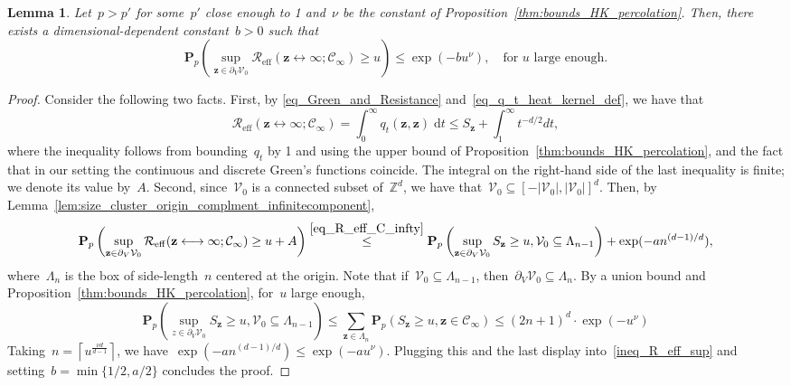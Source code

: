 \documentclass[a4paper,11pt]{article}
\newcommand{\ZZ}{\mathbb{Z}}
\newtheorem{lemma}{Lemma}
\theoremstyle{definition}
\begin{document}
\begin{lemma}\label{lemma:sup_reff_C_infty}
Let~$p>p'$ for some~$p'$ close enough to 1 and~$\nu$ be the constant of Proposition~\ref{thm:bounds_HK_percolation}. Then, there exists a dimensional-dependent constant~$b>0$ such that
$$ \mathbf P_p \left( \sup_{ \mathbf z \in \partial_V\mathcal V_0} \mathcal R_\mathrm{eff}( \mathbf z \longleftrightarrow \infty ; \mathcal C_\infty ) \ge u \right) \leq  \exp( -b u^\nu ), \quad \text{for } u \text{ large enough.} $$
\end{lemma}
\begin{proof}
Consider the following two facts. First, by \eqref{eq_Green_and_Resistance} and~\eqref{eq_q_t_heat_kernel_def}, we have that 
\begin{equation}\label{eq_R_eff_C_infty}
\mathcal R_\mathrm{eff}( \mathbf{z} \longleftrightarrow \infty; \mathcal C_{\infty} ) = \int_0^\infty q_t(\mathbf z,\mathbf z) \; \mathrm{d}t \leq S_\mathbf{z} + \int_1^{\infty} t^{-d/2}dt,
\end{equation}
where the inequality follows from bounding~$q_t$ by 1 and using the upper bound of Proposition~\ref{thm:bounds_HK_percolation}, and the fact that in our setting the continuous and discrete Green's functions coincide. The integral on the right-hand side of the last inequality is finite; we denote its value by~$A$. Second, since~$\mathcal V_0$ is a connected subset of~$\ZZ^d$, we have that~$\mathcal V_0 \subseteq [-|\mathcal V_0|, |\mathcal V_0|]^d$. Then, by Lemma~\ref{lem:size_cluster_origin_complment_infinitecomponent},
\begin{equation}\label{ineq_R_eff_sup}
\mathbf P_p \left( \sup_{\mathbf z \in \partial_V\mathcal V_0} \mathcal R_\mathrm{eff}( \mathbf z \longleftrightarrow \infty ; \mathcal C_\infty ) \ge u + A \right) \stackrel{\eqref{eq_R_eff_C_infty}} \leq \mathbf P_p \left( \sup_{\mathbf z \in \partial_V\mathcal V_0} S_\mathbf{z} \ge u, \mathcal V_0 \subseteq \Lambda_{n-1} \right) + \exp(-an^{(d-1)/d}),
\end{equation}
where~$\Lambda_n$ is the box of side-length~$n$ centered at the origin. Note that if~$\mathcal V_0 \subseteq \Lambda_{n-1}$, then~$\partial_V\mathcal V_0 \subseteq \Lambda_n$. By a union bound and Proposition~\ref{thm:bounds_HK_percolation}, for~$u$ large enough,
$$ \mathbf P_p \left( \sup_{z \in \partial_V\mathcal V_0} S_\mathbf{z} \ge u, \mathcal V_0 \subseteq \Lambda_{n-1} \right) \leq \sum_{\mathbf z \in \Lambda_n} \mathbf P_p( S_\mathbf{z} \ge u, \mathbf z \in \mathcal C_\infty ) \leq (2n+1)^d \cdot \exp(-u^\nu) $$
Taking~$n = \left \lceil u^{\frac{\nu d}{d-1}}\right \rceil$, we have~$\exp(-an^{(d-1)/d}) \leq \exp(-au^\nu)$. Plugging this and the last display into~\eqref{ineq_R_eff_sup} and setting~$b=\min\{1/2,a/2\}$ concludes the proof.
\end{proof}
\end{document}
